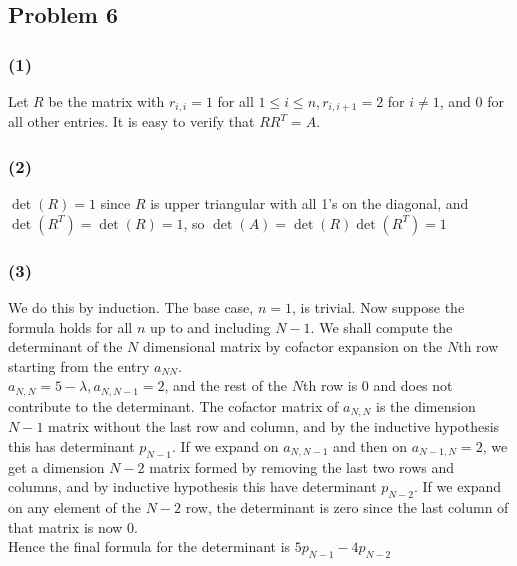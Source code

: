 \documentclass{article}
\begin{document}
\subsection{Problem 6}
\subsubsection{(1)} Let $R$ be the matrix with $r_{i,i}=1$ for all $1\le i\le n, r_{i,i+1}=2$ for $i\neq 1$, and 0 for all other entries. It is easy to verify that $RR^T=A$. 
\subsubsection{(2)} $\det(R)=1$ since $R$ is upper triangular with all 1's on the diagonal, and $\det(R^T)=\det(R)=1$, so $\det(A)=\det(R)\det(R^T)=1$
\subsubsection{(3)} We do this by induction. The base case, $n=1$, is trivial. Now suppose the formula holds for all $n$ up to and including $N-1$. We shall compute the determinant of the $N$ dimensional matrix by cofactor expansion on the $N$th row starting from the entry $a_{NN}$. 
\\$a_{N,N}=5-\lambda,a_{N,N-1}=2$, and the rest of the $N$th row is 0 and does not contribute to the determinant. The cofactor matrix of $a_{N,N}$ is the dimension $N-1$ matrix without the last row and column, and by the inductive hypothesis this has determinant $p_{N-1}$. If we expand on $a_{N,N-1}$ and then on $a_{N-1,N}=2$, we get a dimension $N-2$ matrix formed by removing the last two rows and columns, and by inductive hypothesis this have determinant $p_{N-2}$. If we expand on any element of the $N-2$ row, the determinant is zero since the last column of that matrix is now 0.
\\Hence the final formula for the determinant is $5p_{N-1}-4p_{N-2}$
\end{document}
